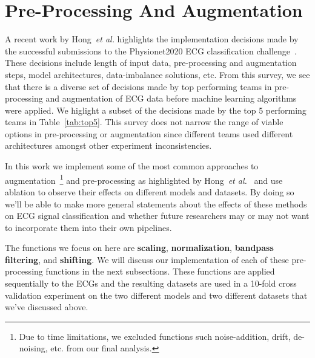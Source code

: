 \documentclass{article}
\begin{document}
\section{Pre-Processing And Augmentation}
\label{sec:processing}

A recent work by Hong~\textit{et al.} highlights the implementation decisions made by the successful submissions to the Physionet2020 ECG classification challenge~\cite{hong2022practical}. These decisions include length of input data, pre-processing and augmentation steps, model architectures, data-imbalance solutions, etc. From this survey, we see that there is a diverse set of decisions made by top performing teams in pre-processing and augmentation of ECG data before machine learning algorithms were applied. We higlight a subset of the decisions made by the top 5 performing teams in Table~\ref{tab:top5}.  This survey does not narrow the range of viable options in pre-processing or augmentation since different teams used different architectures amongst other experiment inconsistencies. 

In this work we implement some of the most common approaches to augmentation~\footnote{Due to time limitations, we excluded functions such noise-addition, drift, de-noising, etc. from our final analysis.} and pre-processing as highlighted by Hong~\textit{et al.}~\cite{hong2022practical} and use ablation to observe their effects on different models and datasets. By doing so we'll be able to make more general statements about the effects of these methods on ECG signal classification and whether future researchers may or may not want to incorporate them into their own pipelines. 

The functions we focus on here are \textbf{scaling}, \textbf{normalization}, \textbf{bandpass filtering}, and \textbf{shifting}. We will discuss our implementation of each of these pre-processing functions in the next subsections. These functions are applied sequentially to the ECGs and the resulting datasets are used in a 10-fold cross validation experiment on the two different models and two different datasets that we've discussed above. 
\end{document}
